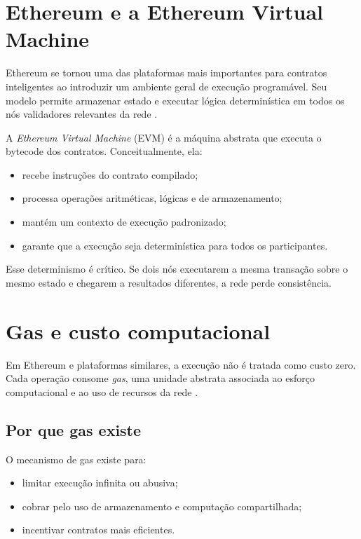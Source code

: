 \section{Ethereum e a Ethereum Virtual Machine}
Ethereum se tornou uma das plataformas mais importantes para contratos inteligentes ao introduzir um ambiente geral de execução programável. Seu modelo permite armazenar estado e executar lógica determinística em todos os nós validadores relevantes da rede \citep{ethereum_whitepaper,wood_ethereum}.

A \textit{Ethereum Virtual Machine} (EVM) é a máquina abstrata que executa o bytecode dos contratos. Conceitualmente, ela:
\begin{itemize}[leftmargin=*]
  \item recebe instruções do contrato compilado;
  \item processa operações aritméticas, lógicas e de armazenamento;
  \item mantém um contexto de execução padronizado;
  \item garante que a execução seja determinística para todos os participantes.
\end{itemize}

Esse determinismo é crítico. Se dois nós executarem a mesma transação sobre o mesmo estado e chegarem a resultados diferentes, a rede perde consistência.

\section{Gas e custo computacional}
Em Ethereum e plataformas similares, a execução não é tratada como custo zero. Cada operação consome \textit{gas}, uma unidade abstrata associada ao esforço computacional e ao uso de recursos da rede \citep{wood_ethereum,evm_codes}.

\subsection{Por que gas existe}
O mecanismo de gas existe para:
\begin{itemize}[leftmargin=*]
  \item limitar execução infinita ou abusiva;
  \item cobrar pelo uso de armazenamento e computação compartilhada;
  \item incentivar contratos mais eficientes.
\end{itemize}

